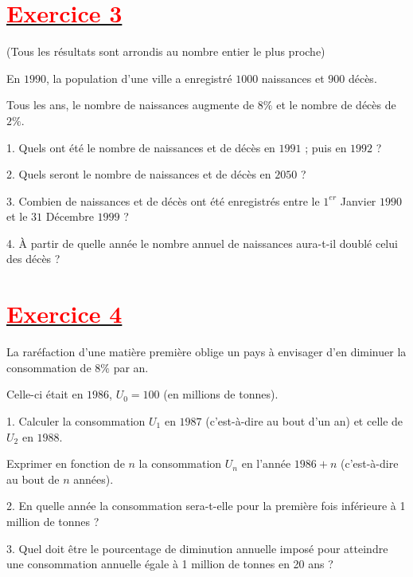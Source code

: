 \documentclass[12pt]{article}
\begin{document}
\section*{\underline{\textbf{\textcolor{red}{Exercice 3}}}}
(Tous les résultats sont arrondis au nombre entier le plus proche)
	
En $1990$, la population d'une ville a enregistré $1000$ naissances et $900$ décès. 
	
Tous les ans, le nombre de naissances augmente de $8\%$ et le nombre de décès de $2\%$.
	
1. Quels ont été le nombre de naissances et de décès en $1991$ ; puis en $1992$ ?
	
2. Quels seront le nombre de naissances et de décès en $2050$ ?
	
3. Combien de naissances et de décès ont été enregistrés entre le $1^{er}$ Janvier $1990$ et le $31$ Décembre $1999$ ?
	
4. À partir de quelle année le nombre annuel de naissances aura-t-il doublé celui des décès ?
\section*{\underline{\textbf{\textcolor{red}{Exercice 4}}}}
La raréfaction d'une matière première oblige un pays à envisager d'en diminuer la consommation de $8\%$ par an.
	
Celle-ci était en $1986$, $U_{0}=100$ (en millions de tonnes).
	
1. Calculer la consommation $U_{1}$ en $1987$ (c'est-à-dire au bout d'un an) et celle de $U_{2}$ en $1988$.
	
Exprimer en fonction de $n$ la consommation $U_{n}$ en l'année $1986+n$ (c'est-à-dire au bout de $n$ années).
	
2. En quelle année la consommation sera-t-elle pour la première fois inférieure à 1 million de tonnes ?
	
3. Quel doit être le pourcentage de diminution annuelle imposé pour atteindre une consommation annuelle égale à 1 million de tonnes en 20 ans ?
\end{document}
